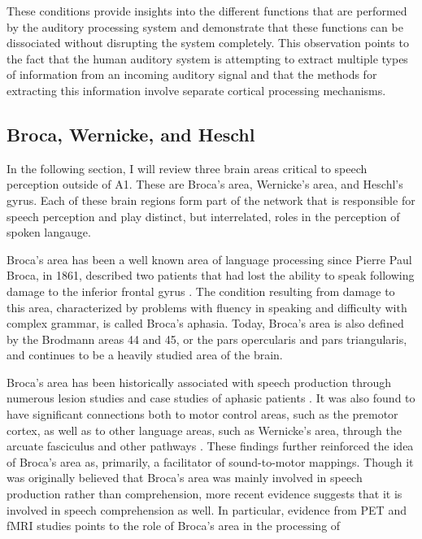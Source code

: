 \documentclass[titlepage]{article}
\begin{document}
    These conditions provide insights into the different functions that are
    performed by the auditory processing system and demonstrate that these
    functions can be dissociated without disrupting the system completely. This
    observation points to the fact that the human auditory system is attempting
    to extract multiple types of information from an incoming auditory signal
    and that the methods for extracting this information involve separate
    cortical processing mechanisms.

  \subsection{Broca, Wernicke, and Heschl}

    In the following section, I will review three brain areas critical to
    speech perception outside of A1. These are Broca's area, Wernicke's area,
    and Heschl's gyrus. Each of these brain regions form part of the network
    that is responsible for speech perception and play distinct, but
    interrelated, roles in the perception of spoken langauge.

    Broca's area has been a well known area of language processing since
    Pierre Paul Broca, in 1861, described two patients that had lost the
    ability to speak following damage to the inferior frontal gyrus
    \cite{Dronkers2007}. The condition resulting from damage to this area,
    characterized by problems with fluency in speaking and difficulty with
    complex grammar, is called Broca's aphasia. Today, Broca's area is also
    defined by the Brodmann areas 44 and 45, or the pars opercularis and pars
    triangularis, and continues to be a heavily studied area of the brain.

    Broca's area has been historically associated with speech
    production through numerous lesion studies and case studies of aphasic
    patients \cite{Dronkers2007}. It was also found to have significant
    connections both to motor control areas, such as the premotor cortex,
    as well as to other language areas, such as Wernicke's area, through the
    arcuate fasciculus and other pathways \cite{Friederici2011}. These findings
    further reinforced the idea of Broca's area as, primarily, a facilitator of
    sound-to-motor mappings. Though it was originally believed that Broca's
    area was mainly involved in
    speech production rather than comprehension, more recent evidence suggests
    that it is involved in speech comprehension as well. In
    particular, evidence from PET and fMRI studies points to the role of Broca's
    area in the processing of 
\end{document}
